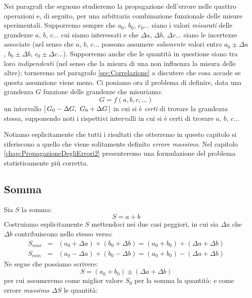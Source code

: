 \noindent Nei paragrafi che seguono studieremo la propagazione
dell'errore nelle quattro operazioni e, di seguito, per una arbitraria
combinazione funzionale delle misure sperimentali.
Supporremo sempre che $a_0$, $b_0$, $c_0\ldots$ siano i valori
{\itshape misurati} delle grandezze $a$, $b$, $c\ldots$ cui siamo interessati
e che $\Delta a$, $\Delta b$, $\Delta c\ldots$ siano le incertezze associate
(nel senso che $a$, $b$, $c\ldots$ possono assumere {\itshape solamente}
valori entro $a_0 \pm \Delta a$, $b_0 \pm \Delta b$, $c_0 \pm \Delta c\ldots$).
Supporremo anche che le quantit\`a in
questione siano tra loro {\itshape indipendenti} (nel senso che la misura di
una non influenza la misura delle altre); torneremo nel paragrafo
\ref{sec:Correlazione} a discutere che cosa accade se questa assunzione
viene meno.
Ci poniamo ora il problema di definire, data una grandezza $G$ funzione
delle grandezze che misuriamo:
$$
G = f(a, b, c, \ldots)
$$
un intervallo $\left[ \, G_0 - \Delta G, ~ G_0 + \Delta G \, \right]$ in cui si \`e
{\itshape certi} di trovare la grandezza stessa, supponendo noti i rispettivi
intervalli in cui si \`e certi di trovare $a$, $b$, $c\ldots$

Notiamo esplicitamente che tutti i risultati che otterremo in questo capitolo
si riferiscono a quello che viene solitamente definito
{\itshape errore massimo}.
Nel capitolo \ref{chap:PropagazioneDegliErrori2} presenteremo una
formulazione del problema statisticamente pi\`u corretta.


\subsection{Somma}

Sia $S$ la somma:
$$
S = a + b
$$
Costruiamo esplicitamente $S$ mettendoci nei due casi peggiori,
in cui sia $\Delta a$ che $\Delta b$ contribuiscono nello stesso verso:
\begin{eqnarray*}
S_{max} &=& (a_0+\Delta a)+(b_0+\Delta b) = (a_0+b_0)+(\Delta a+\Delta b)\\
S_{min} &=& (a_0-\Delta a)+(b_0-\Delta b) = (a_0+b_0)-(\Delta a+\Delta b)
\end{eqnarray*}
Ne segue che possiamo scrivere:
$$
S = (a_0 + b_0) \pm (\Delta a+\Delta b)
$$
per cui assumeremo come miglior valore $S_0$ per la somma la quantit\`a:
e come errore {\itshape massimo} $\Delta S$ le quantit\`a:

\begin{exemplify}


\end{exemplify}


